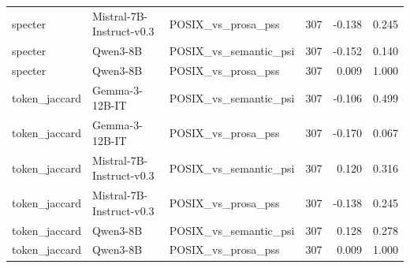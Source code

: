 \begin{tabular}{lllrrr}
specter & Mistral-7B-Instruct-v0.3 & POSIX\_vs\_prosa\_pss & 307 & -0.138 & 0.245 \\
specter & Qwen3-8B & POSIX\_vs\_semantic\_psi & 307 & -0.152 & 0.140 \\
specter & Qwen3-8B & POSIX\_vs\_prosa\_pss & 307 & 0.009 & 1.000 \\
token\_jaccard & Gemma-3-12B-IT & POSIX\_vs\_semantic\_psi & 307 & -0.106 & 0.499 \\
token\_jaccard & Gemma-3-12B-IT & POSIX\_vs\_prosa\_pss & 307 & -0.170 & 0.067 \\
token\_jaccard & Mistral-7B-Instruct-v0.3 & POSIX\_vs\_semantic\_psi & 307 & 0.120 & 0.316 \\
token\_jaccard & Mistral-7B-Instruct-v0.3 & POSIX\_vs\_prosa\_pss & 307 & -0.138 & 0.245 \\
token\_jaccard & Qwen3-8B & POSIX\_vs\_semantic\_psi & 307 & 0.128 & 0.278 \\
token\_jaccard & Qwen3-8B & POSIX\_vs\_prosa\_pss & 307 & 0.009 & 1.000 \\
\bottomrule
\end{tabular}
